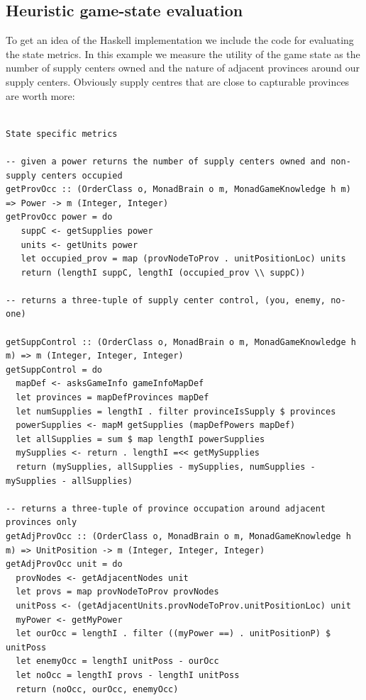\documentclass[pdftex,11pt,a4paper]{report}
\begin{document}
\subsection{Heuristic game-state evaluation}

To get an idea of the Haskell implementation we include the code
for evaluating the state metrics. In this example we measure the
utility of the game state as the number of supply centers owned
and the nature of adjacent provinces around our supply centers. Obviously
supply centres that are close to capturable provinces are worth more:

\begin{verbatim}

State specific metrics

-- given a power returns the number of supply centers owned and non-supply centers occupied
getProvOcc :: (OrderClass o, MonadBrain o m, MonadGameKnowledge h m) => Power -> m (Integer, Integer)
getProvOcc power = do
   suppC <- getSupplies power
   units <- getUnits power
   let occupied_prov = map (provNodeToProv . unitPositionLoc) units
   return (lengthI suppC, lengthI (occupied_prov \\ suppC))

-- returns a three-tuple of supply center control, (you, enemy, no-one)

getSuppControl :: (OrderClass o, MonadBrain o m, MonadGameKnowledge h m) => m (Integer, Integer, Integer)
getSuppControl = do
  mapDef <- asksGameInfo gameInfoMapDef
  let provinces = mapDefProvinces mapDef
  let numSupplies = lengthI . filter provinceIsSupply $ provinces
  powerSupplies <- mapM getSupplies (mapDefPowers mapDef)
  let allSupplies = sum $ map lengthI powerSupplies
  mySupplies <- return . lengthI =<< getMySupplies
  return (mySupplies, allSupplies - mySupplies, numSupplies - mySupplies - allSupplies)

-- returns a three-tuple of province occupation around adjacent provinces only
getAdjProvOcc :: (OrderClass o, MonadBrain o m, MonadGameKnowledge h m) => UnitPosition -> m (Integer, Integer, Integer)
getAdjProvOcc unit = do
  provNodes <- getAdjacentNodes unit
  let provs = map provNodeToProv provNodes
  unitPoss <- (getAdjacentUnits.provNodeToProv.unitPositionLoc) unit
  myPower <- getMyPower
  let ourOcc = lengthI . filter ((myPower ==) . unitPositionP) $ unitPoss
  let enemyOcc = lengthI unitPoss - ourOcc
  let noOcc = lengthI provs - lengthI unitPoss
  return (noOcc, ourOcc, enemyOcc)

\end{verbatim}
\end{document}

